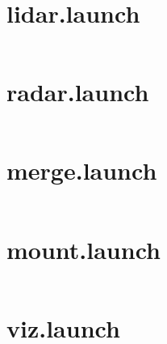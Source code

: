 \section{lidar.launch}
\label{Appdix:lidar.launch}
\inputminted{xml}{ros_system/launch/src/sublaunch/lidar.launch}

\section{radar.launch}
\label{Appdix:radar.launch}
\inputminted{xml}{ros_system/launch/src/sublaunch/radar.launch}

\section{merge.launch}
\label{Appdix:merge.launch}
\inputminted{xml}{ros_system/launch/src/sublaunch/merge.launch}

\section{mount.launch}
\label{Appdix:mount.launch}
\inputminted{xml}{ros_system/launch/src/sublaunch/mount.launch}

\section{viz.launch}
\label{Appdix:viz.launch}
\inputminted{xml}{ros_system/launch/src/sublaunch/viz.launch}

